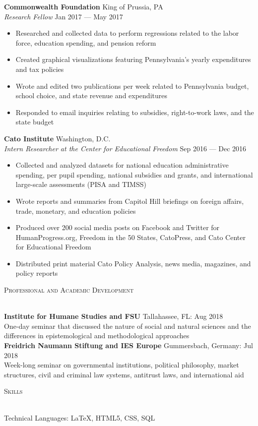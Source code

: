 \documentclass[a4paper]{article}
\newcommand{\lineunder} {
    \vspace*{-8pt} \\
    \hspace*{-18pt} \hrulefill \\
}
\newcommand{\header} [1] {
    {\hspace*{-18pt}\vspace*{6pt} \textsc{\large{#1}}}
    \vspace*{-6pt} \lineunder
}
\begin{document}
\textbf{Commonwealth Foundation} \hfill King of Prussia, PA\\
\textit{Research Fellow} \hfill Jan 2017 --- May 2017\\
\begin{itemize}[noitemsep,nolistsep]
	\item Researched and collected data to perform regressions related to the labor force, education spending, and pension reform
	\item Created graphical visualizations featuring Pennsylvania’s yearly expenditures and tax policies
	\item Wrote and edited two publications per week related to Pennsylvania budget, school choice, and state revenue and expenditures
	\item Responded to email inquiries relating to subsidies, right-to-work laws, and the state budget
\end{itemize}
\vspace{1mm}
\textbf{Cato Institute} \hfill Washington, D.C.\\
\textit{Intern Researcher at the Center for Educational Freedom} \hfill Sep 2016 --- Dec 2016\\
\begin{itemize}[noitemsep,nolistsep]
	\item Collected and analyzed datasets for national education administrative spending, per pupil spending, national subsidies and grants, and international large-scale assessments (PISA and TIMSS)
	\item Wrote reports and summaries from Capitol Hill briefings on foreign affairs, trade, monetary, and education policies
	\item Produced over 200 social media posts on Facebook and Twitter for HumanProgress.org, Freedom in the 50 States, CatoPress, and Cato Center for Educational Freedom
	\item Distributed print material Cato Policy Analysis, news media, magazines, and policy reports
\end{itemize}
\vspace{2mm}

\header{Professional and Academic Development}
\vspace{1mm}

\textbf{Institute for Humane Studies and FSU} \hfill Tallahassee, FL: Aug 2018\\
One-day seminar that discussed the nature of social and natural sciences and the differences in epistemological and methodological approaches \\
\vspace{1mm}
\textbf{Freidrich Naumann Stiftung and IES Europe} \hfill Gummersbach, Germany: Jul 2018\\
Week-long seminar on governmental institutions, political philosophy, market structures, civil and criminal law systems, antitrust laws, and international aid\\
\vspace{2mm}

\header{Skills}
\vspace{1mm}

Technical Languages: \LaTeX, HTML5, CSS, SQL\\
\end{document}
